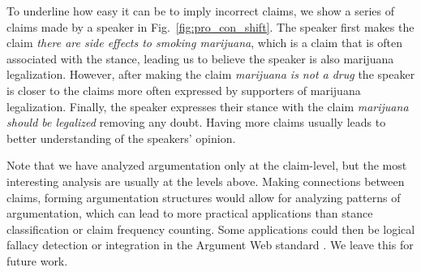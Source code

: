 To underline how easy it can be to imply incorrect claims, we show a series of
claims made by a speaker in Fig.~\ref{fig:pro_con_shift}.  The speaker first
makes the claim \emph{there are side effects to smoking marijuana}, which is a
claim that is often associated with the  stance, leading us to believe
the speaker is also  marijuana legalization.  However, after
making the claim \emph{marijuana is not a drug} the speaker is closer to the
claims more often expressed by supporters of marijuana legalization.  Finally,
the speaker expresses their  stance with the claim \emph{marijuana
should be legalized} removing any doubt. Having more claims usually leads to
better understanding of the speakers' opinion. 

Note that we have analyzed argumentation only at the 
claim-level, but the most interesting analysis are usually at the levels above. 
Making connections between claims, forming argumentation structures would allow
for analyzing patterns of argumentation, which can lead to 
more practical applications
than stance classification or claim frequency counting. 
Some applications could then 
be logical fallacy detection or integration in the Argument Web standard
\citep{rahwan2007laying}. We leave this for future work.


% 
% 


